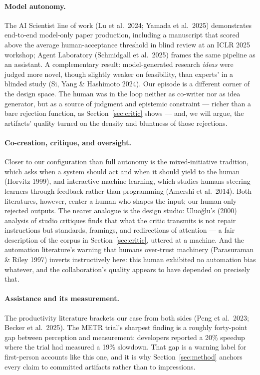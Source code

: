 \documentclass[12pt]{article}
\begin{document}
\paragraph{Model autonomy.} The AI Scientist line of work (Lu et al.\ 2024; Yamada et al.\ 2025) demonstrates end-to-end model-only paper production, including a manuscript that scored above the average human-acceptance threshold in blind review at an ICLR 2025 workshop; Agent Laboratory (Schmidgall et al.\ 2025) frames the same pipeline as an assistant. A complementary result: model-generated research \emph{ideas} were judged more novel, though slightly weaker on feasibility, than experts' in a blinded study (Si, Yang \& Hashimoto 2024). Our episode is a different corner of the design space. The human was in the loop neither as co-writer nor as idea generator, but as a source of judgment and epistemic constraint — richer than a bare rejection function, as Section~\ref{sec:critic} shows — and, we will argue, the artifacts' quality turned on the density and bluntness of those rejections.

\paragraph{Co-creation, critique, and oversight.} Closer to our configuration than full autonomy is the mixed-initiative tradition, which asks when a system should act and when it should yield to the human (Horvitz 1999), and interactive machine learning, which studies humans steering learners through feedback rather than programming (Amershi et al.\ 2014). Both literatures, however, center a human who shapes the input; our human only rejected outputs. The nearer analogue is the design studio: Uluoğlu's (2000) analysis of studio critiques finds that what the critic transmits is not repair instructions but standards, framings, and redirections of attention — a fair description of the corpus in Section~\ref{sec:critic}, uttered at a machine. And the automation literature's warning that humans over-trust machinery (Parasuraman \& Riley 1997) inverts instructively here: this human exhibited no automation bias whatever, and the collaboration's quality appears to have depended on precisely that.

\paragraph{Assistance and its measurement.} The productivity literature brackets our case from both sides (Peng et al.\ 2023; Becker et al.\ 2025). The METR trial's sharpest finding is a roughly forty-point gap between perception and measurement: developers reported a 20\% speedup where the trial had measured a 19\% slowdown. That gap is a warning label for first-person accounts like this one, and it is why Section~\ref{sec:method} anchors every claim to committed artifacts rather than to impressions.
\end{document}
